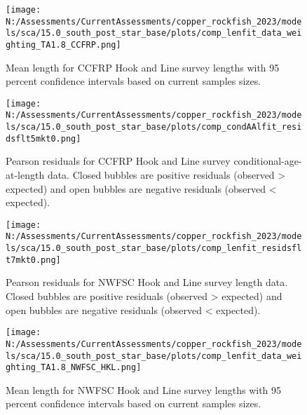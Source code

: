 \documentclass[11pt,
  english,
  letterpaper,
]{article}
\begin{document}
\pagebreak

\begin{figure}
\centering
\texttt{[image: N:/Assessments/CurrentAssessments/copper\_rockfish\_2023/models/sca/15.0\_south\_post\_star\_base/plots/comp\_lenfit\_data\_weighting\_TA1.8\_CCFRP.png]}
\caption{Mean length for CCFRP Hook and Line survey lengths with 95 percent confidence intervals based on current samples sizes.\label{fig:ccfrp-mean-len-fit}}
\end{figure}

\pagebreak

\begin{figure}
\centering
\texttt{[image: N:/Assessments/CurrentAssessments/copper\_rockfish\_2023/models/sca/15.0\_south\_post\_star\_base/plots/comp\_condAAlfit\_residsflt5mkt0.png]}
\caption{Pearson residuals for CCFRP Hook and Line survey conditional-age-at-length data. Closed bubbles are positive residuals (observed \textgreater{} expected) and open bubbles are negative residuals (observed \textless{} expected).\label{fig:ccfrp-age-pearson}}
\end{figure}

\pagebreak

\pagebreak

\pagebreak

\begin{figure}
\centering
\texttt{[image: N:/Assessments/CurrentAssessments/copper\_rockfish\_2023/models/sca/15.0\_south\_post\_star\_base/plots/comp\_lenfit\_residsflt7mkt0.png]}
\caption{Pearson residuals for NWFSC Hook and Line survey length data. Closed bubbles are positive residuals (observed \textgreater{} expected) and open bubbles are negative residuals (observed \textless{} expected).\label{fig:nwfsc-hkl-pearson}}
\end{figure}

\pagebreak

\begin{figure}
\centering
\texttt{[image: N:/Assessments/CurrentAssessments/copper\_rockfish\_2023/models/sca/15.0\_south\_post\_star\_base/plots/comp\_lenfit\_data\_weighting\_TA1.8\_NWFSC\_HKL.png]}
\caption{Mean length for NWFSC Hook and Line survey lengths with 95 percent confidence intervals based on current samples sizes.\label{fig:nwfsc-hkl-mean-len-fit}}
\end{figure}

\pagebreak
\end{document}

